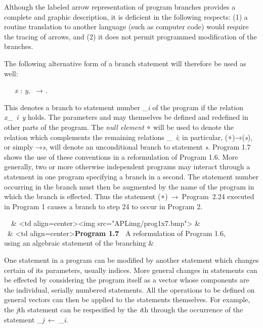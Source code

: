 \par Although the labeled arrow representation of program branches provides a complete and graphic description, it is deficient in the following respects: (1) a routine translation to another language (such as computer code) would require the tracing of arrows, and (2) it does not permit programmed modification of the branches.

\par The following alternative form of a branch statement will therefore be used as well:

\par \ \ \ \textit{x} : \textit{y},\ 
 → .

\par This denotes a branch to statement number _{\textit{i}} of the program if the relation 
\textit{x}_{\textit{\ i\ }}\textit{y} holds. The parameters  and \mathbf{s} may themselves be defined and redefined in other parts of the program. The \textit{null element} ∘ will be used to denote the relation which complements the remaining relations \mathbf{r}_{\textit{\ i}}; in particular, (∘)→(\textit{s}), or simply →\textit{s}, will denote an unconditional branch to statement \textit{s}. Program 1.7 shows the use of these conventions in a reformulation of Program 1.6. More generally, two or more otherwise independent programs may interact through a statement in one program specifying a branch in a second. The statement number occurring in the branch must then be augmented by the name of the program in which the branch is effected. Thus the statement (∘)\ →\ Program\ 2.24 executed in Program 1 causes a branch to step 24 to occur in Program 2.

\begin{tabularx}
\ \ & <td align=center><img src="APLimg/prog1x7.bmp"> & \\
\ & <td align=center>\textbf{Program 1.7\ } A reformulation of Program 1.6,\\ using an algebraic statement of the branching & \\
\end{tabularx}

\par One statement in a program can be modified by another statement which changes certain of its parameters, usually indices. More general changes in statements can be effected by considering the program itself as a vector  whose components are the individual, serially numbered statements. All the operations to be defined on general vectors can then be applied to the statements themselves. For example, the \textit{j}th statement can be respecified by the \textit{i}th through the occurrence of the statement 
\mathbf{p}_{\textit{j}}\ ←\ \mathbf{p}_{\textit{i}}.

